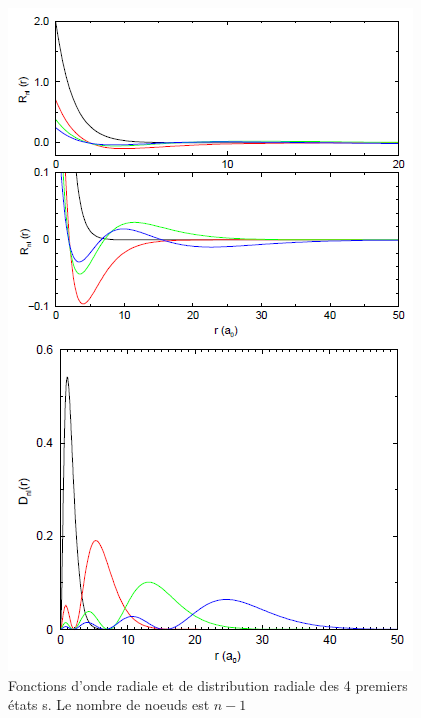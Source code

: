 \begin{figure}[tph]
    \centering
    \includegraphics[scale=0.8]{Images2/ex.PNG}
    \caption{Fonctions d'onde radiale et de distribution radiale des 4 premiers états s. Le nombre de noeuds est $n-1$}
    \label{fig:fcx_et_dist_rad_1}
\end{figure}

